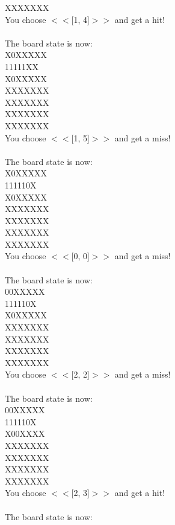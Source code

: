 \documentclass[pdflatex,sn-nature]{sn-jnl}%
\theoremstyle{thmstyleone}%
\theoremstyle{thmstyletwo}%
\theoremstyle{thmstylethree}%
\begin{document}
XXXXXXX $~$\\ 
You choose $<<$[1, 4]$>>$ and get a hit! $~$\\ 
 $~$\\ 
The board state is now: $~$\\ 
X0XXXXX $~$\\ 
11111XX $~$\\ 
X0XXXXX $~$\\ 
XXXXXXX $~$\\ 
XXXXXXX $~$\\ 
XXXXXXX $~$\\ 
XXXXXXX $~$\\ 
You choose $<<$[1, 5]$>>$ and get a miss! $~$\\ 
 $~$\\ 
The board state is now: $~$\\ 
X0XXXXX $~$\\ 
111110X $~$\\ 
X0XXXXX $~$\\ 
XXXXXXX $~$\\ 
XXXXXXX $~$\\ 
XXXXXXX $~$\\ 
XXXXXXX $~$\\ 
You choose $<<$[0, 0]$>>$ and get a miss! $~$\\ 
 $~$\\ 
The board state is now: $~$\\ 
00XXXXX $~$\\ 
111110X $~$\\ 
X0XXXXX $~$\\ 
XXXXXXX $~$\\ 
XXXXXXX $~$\\ 
XXXXXXX $~$\\ 
XXXXXXX $~$\\ 
You choose $<<$[2, 2]$>>$ and get a miss! $~$\\ 
 $~$\\ 
The board state is now: $~$\\ 
00XXXXX $~$\\ 
111110X $~$\\ 
X00XXXX $~$\\ 
XXXXXXX $~$\\ 
XXXXXXX $~$\\ 
XXXXXXX $~$\\ 
XXXXXXX $~$\\ 
You choose $<<$[2, 3]$>>$ and get a hit! $~$\\ 
 $~$\\ 
The board state is now: $~$\\ 
\end{document}
